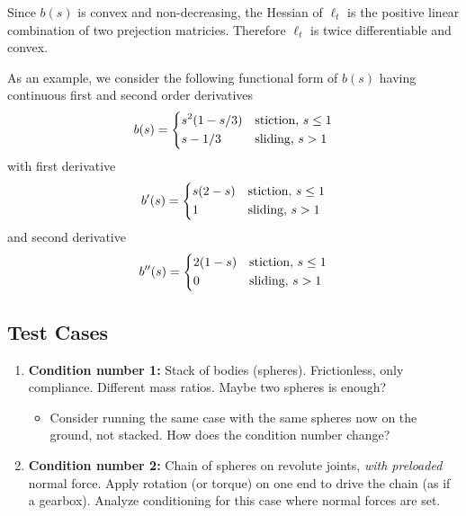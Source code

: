 Since $b(s)$ is convex and non-decreasing, the Hessian of $\ell_t$ is the
positive linear combination of two prejection matricies. Therefore $\ell_t$ is twice differentiable and convex.

As an example, we consider the following functional form of $b(s)$ having continuous first and second order derivatives
\begin{eqnarray}
    b(s)=\begin{dcases}
        s^2(1-s/3) & \text{stiction, } s \le 1\\        
        s - 1/3 & \text{sliding, } s > 1
    \end{dcases}
\end{eqnarray}
with first derivative
\begin{eqnarray}
    b'(s)=\begin{dcases}
        s(2-s) & \text{stiction, } s \le 1\\        
        1 & \text{sliding, } s > 1
    \end{dcases}
\end{eqnarray}
and second derivative
\begin{eqnarray}
    b''(s)=\begin{dcases}
        2(1-s) & \text{stiction, } s \le 1\\        
        0 & \text{sliding, } s > 1
    \end{dcases}
\end{eqnarray}

\subsection{Test Cases}

\begin{enumerate}
    \item \textbf{Condition number 1:} Stack of bodies (spheres). Frictionless, only
    compliance. Different mass ratios. Maybe two spheres is enough? \begin{itemize}
        \item Consider running the same case with the same spheres now on the
        ground, not stacked. How does the condition number change?
    \end{itemize}
    \item \textbf{Condition number 2:} Chain of spheres on revolute joints, \textit{with
    preloaded} normal force. Apply rotation (or torque) on one end to drive the
    chain (as if a gearbox). Analyze conditioning for this case where normal
    forces are set.
\end{enumerate}

